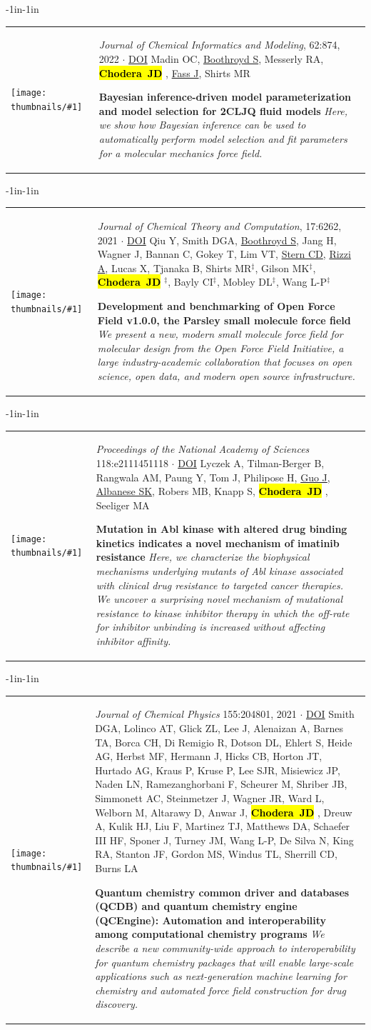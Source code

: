 \documentclass[10pt]{article}
\newcommand{\newarticle}[7]{
\begin{adjustwidth}{-1in}{-1in}  
\begin{tabular}{p{0.9in}p{7in}}
\parbox[c]{0.9in}{\texttt{[image: thumbnails/\#1]}} & \parbox[c]{6in}{\setstretch{0.9} {\small #4} $\cdot$ \href{#6}{#5} \\ {\footnotesize {#2}} \\ \raggedright { \bf\nohyphens{#3}}  \\ {\footnotesize\emph {#7}}} %
\end{tabular}
\end{adjustwidth}
\vspace{0.2in}
}
\newcommand{\jdc}{ {\bf \hl{Chodera~JD}} } %
\begin{document}
\newarticle{2CLJQ}{Madin OC, \underline{Boothroyd S}, Messerly RA, \jdc, \underline{Fass J}, Shirts MR}{Bayesian inference-driven model parameterization and model selection for 2CLJQ fluid models}{\emph{Journal of Chemical Informatics and Modeling}, 62:874, 2022}{DOI}{https://doi.org/10.1021/acs.jcim.1c00829}{Here, we show how Bayesian inference can be used to automatically perform model selection and fit parameters for a molecular mechanics force field.}

\newarticle{parsley.pdf}{Qiu Y, Smith DGA, \underline{Boothroyd S}, Jang H, Wagner J, Bannan C, Gokey T, Lim VT, \underline{Stern CD}, \underline{Rizzi A}, Lucas X, Tjanaka B, Shirts MR$^\ddag$, Gilson MK$^\ddag$, \jdc$^\ddag$, Bayly CI$^\ddag$, Mobley DL$^\ddag$, Wang L-P$^\ddag$}{Development and benchmarking of Open Force Field v1.0.0, the Parsley small molecule force field}{\emph{Journal of Chemical Theory and Computation}, 17:6262, 2021}{DOI}{https://doi.org/10.1021/acs.jctc.1c00571}{We present a new, modern small molecule force field for molecular design from the Open Force Field Initiative, a large industry-academic collaboration that focuses on open science, open data, and modern open source infrastructure.}

\newarticle{abl-mutant-kinetics}{Lyczek A, Tilman-Berger B, Rangwala AM, Paung Y, Tom J, Philipose H, \underline{Guo J}, \underline{Albanese SK}, Robers MB, Knapp S, \jdc, Seeliger MA}{Mutation in Abl kinase with altered drug binding kinetics indicates a novel mechanism of imatinib resistance}{\emph{Proceedings of the National Academy of Sciences} 118:e2111451118}{DOI}{https://doi.org/10.1073/pnas.2111451118, 2021}{Here, we characterize the biophysical mechanisms underlying mutants of Abl kinase associated with clinical drug resistance to targeted cancer therapies. We uncover a surprising novel mechanism of mutational resistance to kinase inhibitor therapy in which the off-rate for inhibitor unbinding is increased without affecting inhibitor affinity.}

\newarticle{qcarchive}{Smith DGA, Lolinco AT, Glick ZL, Lee J, Alenaizan A, Barnes TA, Borca CH, Di Remigio R, Dotson DL, Ehlert S, Heide AG, Herbst MF, Hermann J, Hicks CB, Horton JT, Hurtado AG, Kraus P, Kruse P, Lee SJR, Misiewicz JP, Naden LN, Ramezanghorbani F, Scheurer M, Shriber JB, Simmonett AC, Steinmetzer J, Wagner JR, Ward L, Welborn M, Altarawy D, Anwar J, \jdc, Dreuw A, Kulik HJ, Liu F, Martinez TJ, Matthews DA, Schaefer III HF, Sponer J, Turney JM, Wang L-P, De Silva N, King RA, Stanton JF, Gordon MS, Windus TL, Sherrill CD, Burns LA}{Quantum chemistry common driver and databases (QCDB) and quantum chemistry engine (QCEngine): Automation and interoperability among computational chemistry programs}{\emph{Journal of Chemical Physics} 155:204801, 2021}{DOI}{https://doi.org/10.1063/5.0059356}{We describe a new community-wide approach to interoperability for quantum chemistry packages that will enable large-scale applications such as next-generation machine learning for chemistry and automated force field construction for drug discovery.}
\end{document}

